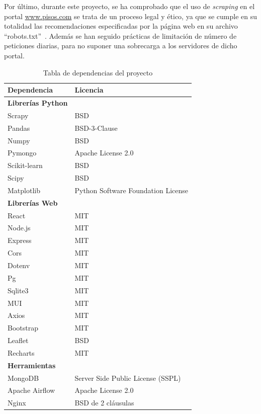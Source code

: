 Por último, durante este proyecto, se ha comprobado que el uso de \textit{scraping} en el portal \url{www.pisos.com} se trata de un proceso legal y ético, ya que se cumple en su totalidad las recomendaciones especificadas por la página web en su archivo ``robots.txt''~\cite{pisosrobotstxt}. Además se han seguido prácticas de limitación de número de peticiones diarias, para no suponer una sobrecarga a los servidores de dicho portal.


\begin{table}[h]
	\centering
	\begin{tabular}{@{}ll@{}}\toprule
		\textbf{Dependencia}         & \textbf{Licencia}     \\ \midrule
		\textbf{Librerías Python} & \\
        Scrapy               & BSD \\
        Pandas               & BSD-3-Clause \\
        Numpy                & BSD \\
		Pymongo              & Apache License 2.0 \\
  	Scikit-learn         & BSD \\
		Scipy                & BSD \\
        Matplotlib           & Python Software Foundation License \\
        \midrule
        \textbf{Librerías Web} & \\
        React                & MIT \\
		Node.js              & MIT \\
        Express              & MIT \\
        Cors                 & MIT \\
		Dotenv               & MIT \\
		Pg                   & MIT \\
		Sqlite3              & MIT \\
        MUI                  & MIT \\
		Axios                & MIT \\
		Bootstrap            & MIT \\
		Leaflet              & BSD \\
		Recharts             & MIT \\
        \midrule
        \textbf{Herramientas} & \\
		MongoDB              & Server Side Public License (SSPL) \\
		Apache Airflow       & Apache License 2.0 \\
		Nginx                & BSD de 2 cláusulas \\
        \bottomrule
	\end{tabular}
	\caption{Tabla de dependencias del proyecto}
	\label{tab:dependencias}
\end{table}

